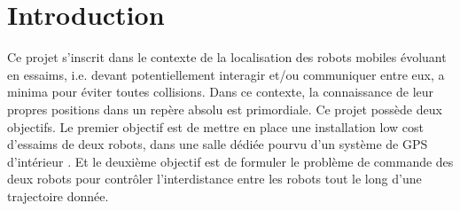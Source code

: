 \section{Introduction}

Ce projet s’inscrit dans le contexte de la localisation des robots mobiles évoluant en essaims, i.e. devant potentiellement interagir et/ou communiquer entre eux, a minima pour éviter toutes collisions. Dans ce contexte, la connaissance de leur propres positions dans un repère absolu est primordiale. Ce projet possède deux objectifs. Le premier objectif est de mettre en place une installation \og low cost \fg{} d’essaims de deux robots, dans une salle dédiée pourvu d’un système de \og GPS d’intérieur \fg{}. Et le deuxième objectif est de formuler le problème de commande des deux robots pour contrôler l'interdistance entre les robots tout le long d'une trajectoire donnée.